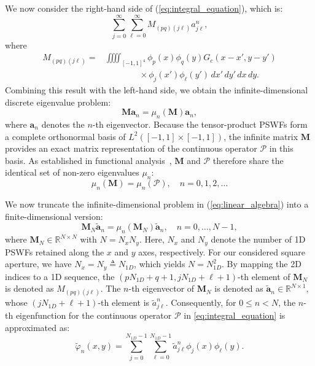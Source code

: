 \documentclass[lettersize,journal]{IEEEtran}
\theoremstyle{plain}
\begin{document}
We now consider the right-hand side of (\ref{eq:integral_equation}), which is:
$$
	\sum_{j=0}^{\infty}\sum_{\ell=0}^{\infty}M_{(pq)(j\ell)}a_{j\ell}^n,
	\label{eq:RHS}
$$
where
\begin{align}
	M_{(pq)(j\ell)} = &\iiiint_{[-1,1]^4} \phi_p(x)\phi_q(y)G_c(x-x', y-y')\nonumber \\ 
	&\qquad\qquad \times \phi_j(x')\phi_\ell(y') \, dx' \, dy' \, dx \, dy.
	\label{eq:M_pq_jl}
\end{align}
Combining this result with the left-hand side, we obtain the infinite-dimensional discrete eigenvalue problem:
\begin{equation}
	\mathbf{M}\mathbf{a}_n = \mu_n(\mathbf{M}) \mathbf{a}_n,
	\label{eq:linear_algebra}
\end{equation}
where $\mathbf{a}_n$ denotes the $n$-th eigenvector. 
Because the tensor-product PSWFs form a complete orthonormal basis of $L^2([-1, 1]\times[-1, 1])$, the infinite matrix $\mathbf{M}$ provides an exact matrix representation of the continuous operator $\mathcal{P}$ in this basis.
As established in functional analysis~\cite{hackbusch2011integral, reed1980methods}, $\mathbf{M}$ and $\mathcal{P}$ therefore share the identical set of non-zero eigenvalues $\mu_n$:
\begin{equation}
	\mu_n(\mathbf{M}) = \mu_n(\mathcal{P}), \quad n = 0, 1, 2, \ldots
	\label{eq:eigenvalue_equivalence}
\end{equation}
	
We now truncate the infinite-dimensional problem in (\ref{eq:linear_algebra}) into a finite-dimensional version:
\begin{equation}
	\mathbf{M}_N\tilde{\mathbf{a}}_n = \mu_n(\mathbf{M}_N) \tilde{\mathbf{a}}_n, \quad n = 0, \ldots, N-1,
	\label{eq:EVD_N}
\end{equation}
where $\mathbf{M}_N \in \mathbb{R}^{N \times N}$ with $N = N_xN_y$. Here, $N_x$ and $N_y$ denote the number of 1D PSWFs retained along the $x$ and $y$ axes, respectively.
For our considered square aperture, we have $N_x = N_y \triangleq N_{1D}$, which yields $N = N_{1D}^2$.
By mapping the 2D indices to a 1D sequence, the $(pN_{1D} + q+1, jN_{1D} + \ell + 1)$-th element of $\mathbf{M}_N$ is denoted as $M_{(pq)(j\ell)}$. The $n$-th eigenvector of $\mathbf{M}_N$ is denoted as $\tilde{\mathbf{a}}_n \in \mathbb{R}^{N \times 1}$, whose $(jN_{1D} + \ell + 1)$-th element is $\tilde{a}_{j\ell}^n$.
Consequently, for $0\le n<N$, the $n$-th eigenfunction for the continuous operator $\mathcal{P}$ in \eqref{eq:integral_equation} is approximated as:
$$
	\tilde{\varphi}_n(x, y) = \sum_{j=0}^{N_{1D} - 1}\sum_{\ell=0}^{N_{1D} - 1}  \tilde{a}_{j\ell}^n\phi_j(x)\phi_\ell(y).
	\label{eq:varphi_n_N}
$$
	
\end{document}
